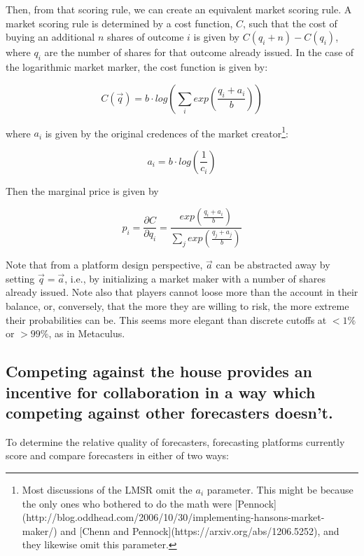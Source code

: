 \documentclass[]{article}
\begin{document}
Then, from that scoring rule, we can create an equivalent market scoring
rule. A market scoring rule is determined by a cost function, \(C\),
such that the cost of buying an additional \(n\) shares of outcome \(i\)
is given by \(C(q_i + n)-C(q_i)\), where \(q_i\) are the number of
shares for that outcome already issued. In the case of the logarithmic
market marker, the cost function is given by:

\[C(\vec{q}) = b \cdot log\left( \sum_i{exp\left(\frac{q_i + a_i}{b}\right)}\right)\]

where \(a_i\) is given by the original credences of the market
creator\footnote{Most discussions of the LMSR omit the $a_i$ parameter. This might be because the only ones who bothered to do the math were [Pennock](http://blog.oddhead.com/2006/10/30/implementing-hansons-market-maker/) and [Chenn and Pennock](https://arxiv.org/abs/1206.5252), and they likewise omit this parameter.}:

\[a_i = b \cdot log\left(\frac{1}{c_i}\right)\]

Then the marginal price is given by

\[p_i = \frac{\partial C}{\partial q_i} = \frac{exp\left(\frac{q_i + a_i}{b}\right)}{\sum_j{exp\left(\frac{q_j + a_j}{b}\right)}}\]

Note that from a platform design perspective, \(\vec{a}\) can be
abstracted away by setting \(\vec{q}=\vec{a}\), i.e., by initializing a
market maker with a number of shares already issued. Note also that
players cannot loose more than the account in their balance, or,
conversely, that the more they are willing to risk, the more extreme
their probabilities can be. This seems more elegant than discrete
cutoffs at \(<1\%\) or \(>99\%\), as in Metaculus.

\hypertarget{competing-against-the-house-provides-an-incentive-for-collaboration-in-a-way-which-competing-against-other-forecasters-doesnt.}{%
\subsection{Competing against the house provides an incentive for
collaboration in a way which competing against other forecasters
doesn't.}\label{competing-against-the-house-provides-an-incentive-for-collaboration-in-a-way-which-competing-against-other-forecasters-doesnt.}}

To determine the relative quality of forecasters, forecasting platforms
currently score and compare forecasters in either of two ways:
\end{document}
